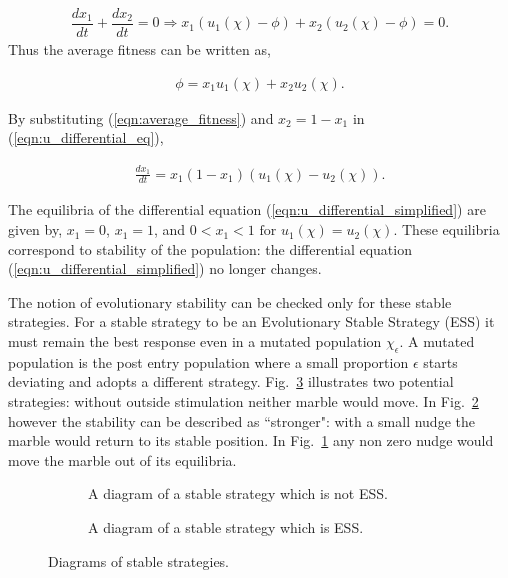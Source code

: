 \documentclass[10pt]{article}
\begin{document}
\begin{eqnarray}
    \dfrac{dx_1}{dt}  + \dfrac{dx_2}{dt} = 0 \Rightarrow x_1(u_1(\chi) - \phi)
     + x_2(u_2(\chi) - \phi)=0.
\end{eqnarray} 
Thus the average fitness can be written as,

\begin{eqnarray}
\label{eqn:average_fitness}
    \phi=x_1u_1(\chi) + x_2u_2(\chi).
\end{eqnarray}

By substituting (\ref{eqn:average_fitness}) and \(x_2= 1 - x_1\) 
in (\ref{eqn:u_differential_eq}),

\begin{eqnarray}
    \label{eqn:u_differential_simplified}
    \frac{dx_1}{dt}= x_1(1 - x_1)(u_1(\chi) - u_2(\chi)).
\end{eqnarray}

The equilibria of the differential equation (\ref{eqn:u_differential_simplified})
are given by, \(x_1=0\), \(x_1=1\), and \(0<x_1<1 \mbox{ for } u_1(\chi)=u_2(\chi)\).
These equilibria correspond to stability of the population: the differential 
equation (\ref{eqn:u_differential_simplified}) no longer changes. 

The notion of evolutionary stability can be checked only for these stable strategies.
For a stable strategy to be an Evolutionary Stable Strategy (ESS) it must remain 
the best response even in a mutated population \(\chi_\epsilon\). A mutated population 
is the post entry population 
where a small proportion \(\epsilon\) starts deviating and adopts a different strategy.
Fig.~\ref{fig:stable_ess_driagrams} illustrates two potential strategies: without 
outside stimulation neither marble would move. In Fig.~\ref{fig:ess_diagram}
however the stability can be described as ``stronger": with a small nudge the marble
would return to its stable position. In Fig.~\ref{fig:stable_diagram} any non zero
nudge would move the marble out of its equilibria.

\begin{figure}[!htbp]
\begin{center}
    \begin{subfigure}{0.40\textwidth}
    
    \caption{\label{fig:stable_diagram} A diagram of a stable strategy which 
    is not ESS.}
    \end{subfigure}
    \begin{subfigure}{0.40\textwidth}
    
    \caption{\label{fig:ess_diagram}A diagram of a stable strategy which is ESS.}
    \end{subfigure}
        \caption{\label{fig:stable_ess_driagrams} Diagrams of stable strategies.}
\end{center}
\end{figure}
\end{document}
